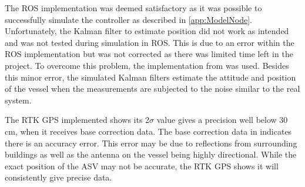 The ROS implementation was deemed satisfactory as it was possible to successfully simulate the controller as described in \autoref{app:ModelNode}. Unfortunately, the Kalman filter to estimate position did not work as intended and was not tested during simulation in ROS. This is due to an error within the ROS implementation but was not corrected as there was limited time left in the project. To overcome this problem, the implementation from \cite{thesis} was used. Besides this minor error, the simulated Kalman filters estimate the attitude and position of the vessel when the measurements are subjected to the noise similar to the real system.

The RTK GPS implemented shows its 2$\sigma$ value gives a precision well below 30 cm, when it receives base correction data. The base correction data in  indicates there is an accuracy error. This error may be due to reflections from surrounding buildings as well as the antenna on the vessel being highly directional. While the exact position of the ASV may not be accurate, the RTK GPS shows it will consistently give precise data.

